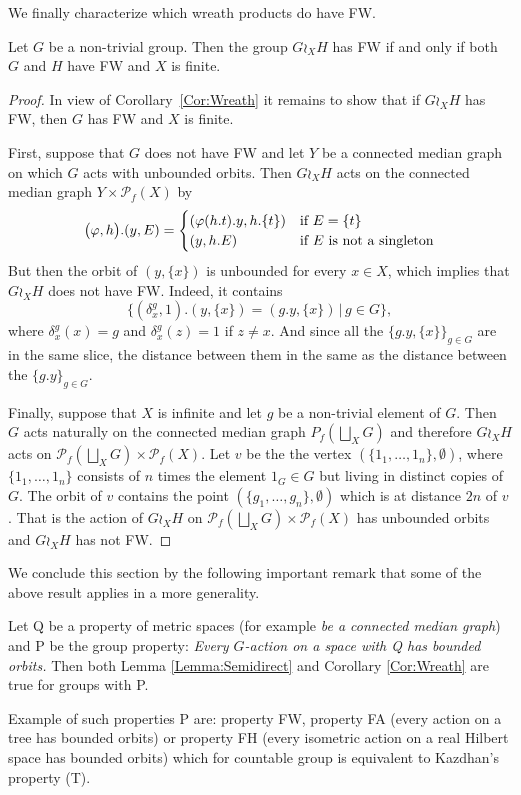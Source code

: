 We finally characterize which wreath products do have FW.
\begin{prop}\label{Prop:Median}
Let $G$ be a non-trivial group.
Then the group $G\wr_X H$ has FW if and only if both $G$ and $H$ have FW and $X$ is finite.
\end{prop}
\begin{proof}
In view of Corollary~\ref{Cor:Wreath} it remains to show that if $G\wr_X H$ has FW, then $G$ has FW and $X$ is finite.

First, suppose that $G$ does not have FW and let $Y$ be a connected median graph on which $G$ acts with unbounded orbits.
Then $G\wr_X H$ acts on the connected median graph $Y\times \mathcal P_f(X)$ by
\[
	\bigl(\phi,h\bigr).(y,E)=
	\begin{cases}
	(\phi(h.t).y,h.\{t\})&\textnormal{if $E=\{t\}$}\\
	(y,h.E)&\textnormal{if $E$ is not a singleton}
	\end{cases}
\]
But then the orbit of $(y,\{x\})$ is unbounded for every $x\in X$, which implies that $G\wr_X H$ does not have FW.
Indeed, it contains
\[
	\{(\delta_{x}^g,1).(y,\{x\})=(g.y,\{x\})\,|\,g\in G\},
\]
where $\delta_{x}^g(x)=g$ and $\delta_{x}^g(z)=1$ if $z\neq x$. 
And since all the $\{g.y,\{x\}\}_{g\in G}$ are in the same slice, the distance between them in the same as the distance between the $\{g.y\}_{g\in G}$.

Finally, suppose that $X$ is infinite and let $g$ be a non-trivial element of $G$.
Then $G$ acts naturally on the connected median graph $P_f(\bigsqcup_XG)$ and therefore $G\wr_X H$ acts on $\mathcal P_f(\bigsqcup_XG)\times \mathcal P_f(X)$.
Let $v$ be the the vertex $(\{1_1,\dots, 1_n\},\emptyset)$, where $\{1_1,\dots, 1_n\}$ consists of $n$ times the element $1_G\in G$ but living in distinct copies of $G$.
The orbit of $v$ contains the point $(\{g_1,\dots, g_n\},\emptyset)$ which is at distance $2n$ of $v$.
That is the action of $G\wr_X H$ on $\mathcal P_f(\bigsqcup_XG)\times \mathcal P_f(X)$ has unbounded orbits and $G\wr_X H$ has not FW.
\end{proof}

We conclude this section by the following important remark that some of the above result applies in a more generality.
\begin{rem}
Let Q be a property of metric spaces (for example \emph{be a connected median graph}) and P be the group property: \emph{Every $G$-action on a space with Q has bounded orbits.}
Then both Lemma \ref{Lemma:Semidirect} and Corollary \ref{Cor:Wreath} are true for groups with P.

Example of such properties P are: property FW, property FA (every action on a tree has bounded orbits) or property FH (every isometric action on a real Hilbert space has bounded orbits) which for countable group is equivalent to Kazdhan's property (T).
\end{rem}


